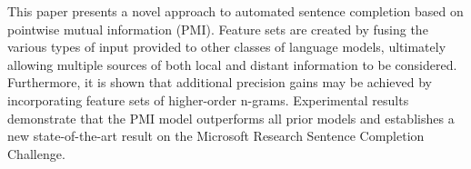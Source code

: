 This paper presents a novel approach to automated sentence completion based on pointwise mutual information (PMI). Feature sets are created by fusing the various types of input provided to other classes of language models, ultimately allowing multiple sources of both local and distant information to be considered. Furthermore, it is shown that additional precision gains may be achieved by incorporating feature sets of higher-order n-grams. Experimental results demonstrate that the PMI model outperforms all prior models and establishes a new state-of-the-art result on the Microsoft Research Sentence Completion Challenge.
